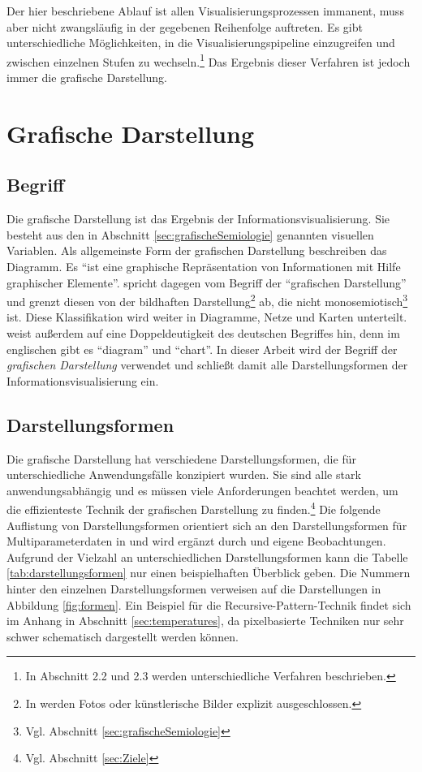 \documentclass[a4paper, 12pt, DIV=calc, version=first, pdftex, headsepline, footsepline, bibtotocnumbered, liststotocnumbered]{scrreprt}
\begin{document}
Der hier beschriebene Ablauf ist allen Visualisierungsprozessen immanent, muss aber nicht zwangsläufig
in der gegebenen Reihenfolge auftreten. Es gibt unterschiedliche Möglichkeiten, in die
Visualisierungspipeline einzugreifen und zwischen einzelnen Stufen zu wechseln.\footnote{In
\citep{Schumann} Abschnitt 2.2 und 2.3 werden unterschiedliche Verfahren beschrieben.}
Das Ergebnis dieser Verfahren ist jedoch immer die grafische Darstellung.

\section{Grafische Darstellung}
\label{sec:Darstellungen}
\subsection{Begriff}
Die grafische Darstellung ist das Ergebnis der Informationsvisualisierung. Sie besteht
aus den in Abschnitt \ref{sec:grafischeSemiologie} genannten
visuellen Variablen.
Als allgemeinste Form der grafischen Darstellung beschreiben \citep{Schumann} das
Diagramm. Es "`ist eine graphische Repräsentation von Informationen mit Hilfe
graphischer Elemente"'\citep[S.\,126]{Schumann}. \citep{Bertin} spricht dagegen
vom Begriff der "`grafischen Darstellung"' und grenzt diesen von
der bildhaften Darstellung\footnote{In \citep{Bertin} werden Fotos oder künstlerische Bilder explizit ausgeschlossen.}
ab, die nicht monosemiotisch\footnote{Vgl. Abschnitt \ref{sec:grafischeSemiologie}} ist.
Diese Klassifikation wird weiter in Diagramme, Netze
und Karten unterteilt. \citep{Schumann} weist außerdem auf eine Doppeldeutigkeit
des deutschen Begriffes hin, denn im englischen gibt es "`diagram"' und "`chart"'.
In dieser Arbeit wird der Begriff der \textit{grafischen Darstellung} verwendet und schließt
damit alle Darstellungsformen der Informationsvisualisierung ein.

\subsection{Darstellungsformen}
\label{sec:Darstellungsformen}
Die grafische Darstellung hat verschiedene Darstellungsformen, die für unterschiedliche
Anwendungsfälle konzipiert wurden. Sie sind alle stark anwendungsabhängig und es müssen viele
Anforderungen beachtet werden, um die effizienteste Technik der grafischen Darstellung zu
finden.\footnote{Vgl. Abschnitt \ref{sec:Ziele}}
Die folgende Auflistung von Darstellungsformen orientiert sich an den Darstellungsformen für
Multiparameterdaten in \citep[S.\,213]{Schumann} und
wird ergänzt durch \citep{Preim} und eigene Beobachtungen. Aufgrund der Vielzahl an unterschiedlichen
Darstellungsformen kann die Tabelle \ref{tab:darstellungsformen} nur einen beispielhaften Überblick geben. Die
Nummern hinter den einzelnen Darstellungsformen verweisen auf die Darstellungen in 
Abbildung \ref{fig:formen}.
Ein Beispiel für die Recursive-Pattern-Technik findet sich im Anhang in Abschnitt \ref{sec:temperatures}, da pixelbasierte
Techniken nur sehr schwer schematisch dargestellt werden können.
\end{document}
